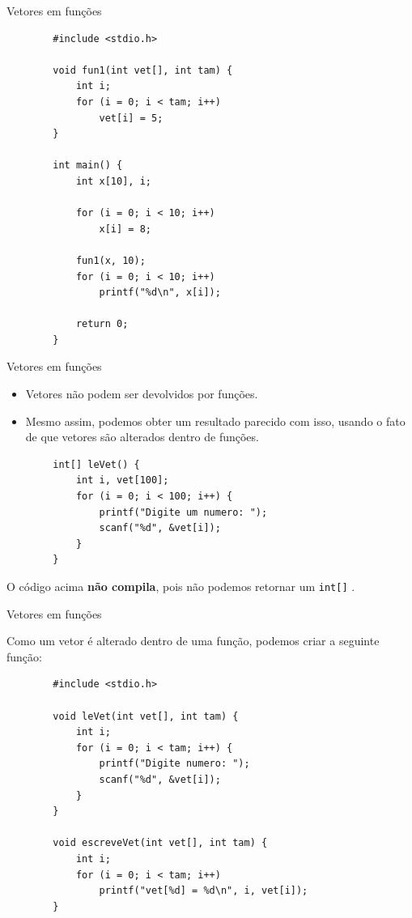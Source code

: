\documentclass[handout]{beamer}
\newcommand{\cod}[1]{\texttt{#1}}
\begin{document}
\begin{frame}[fragile]{Vetores em funções}

    \begin{verbatim}
        #include <stdio.h>

        void fun1(int vet[], int tam) {
            int i;
            for (i = 0; i < tam; i++)
                vet[i] = 5;
        }

        int main() {
            int x[10], i;

            for (i = 0; i < 10; i++)
                x[i] = 8;

            fun1(x, 10);
            for (i = 0; i < 10; i++)
                printf("%d\n", x[i]);

            return 0;
        }
    \end{verbatim}

\end{frame}

\begin{frame}[fragile]{Vetores em funções}

    \begin{itemize}
        \item Vetores não podem ser devolvidos por funções.
        \item Mesmo assim, podemos obter um resultado parecido com isso, usando o fato de que vetores são alterados dentro de funções.
    \end{itemize}

    \begin{verbatim}
        int[] leVet() {
            int i, vet[100];
            for (i = 0; i < 100; i++) {
                printf("Digite um numero: ");
                scanf("%d", &vet[i]);
            }
        }
    \end{verbatim}

    O código acima \textbf{não compila}, pois não podemos retornar um \cod{int[]} .

\end{frame}

\begin{frame}[fragile]{Vetores em funções}
    
    Como um vetor é alterado dentro de uma função, podemos criar a seguinte função:

    \begin{verbatim}
        #include <stdio.h>

        void leVet(int vet[], int tam) {
            int i;
            for (i = 0; i < tam; i++) {
                printf("Digite numero: ");
                scanf("%d", &vet[i]);
            }
        }

        void escreveVet(int vet[], int tam) {
            int i;
            for (i = 0; i < tam; i++)
                printf("vet[%d] = %d\n", i, vet[i]);
        }
    \end{verbatim}

\end{frame}
\end{document}
